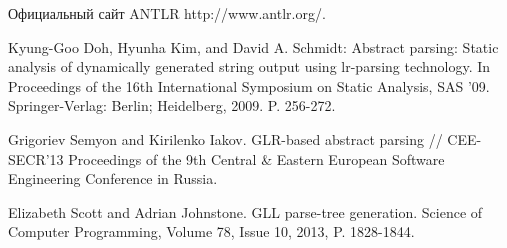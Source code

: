 \begin{thebibliography}{99}
Официальный сайт ANTLR http://www.antlr.org/.

Kyung-Goo Doh, Hyunha Kim, and David A. Schmidt: Abstract parsing: Static analysis of dynamically generated string output using lr-parsing technology. In Proceedings of the 16th International Symposium on Static Analysis, SAS ’09. Springer-Verlag: Berlin; Heidelberg, 2009. P. 256-272.

Grigoriev Semyon and Kirilenko Iakov. GLR-based abstract parsing // CEE-SECR’13 Proceedings of the 9th Central \& Eastern European Software Engineering Conference in Russia.

Elizabeth Scott and Adrian Johnstone. GLL parse-tree generation. Science of Computer Programming, Volume 78, Issue 10, 2013, P. 1828-1844.


\end{thebibliography}


